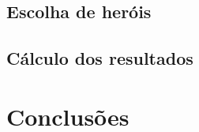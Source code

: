 \documentclass[a4paper]{article}
\begin{document}
\subsection{Escolha de heróis}

\hspace{3mm} 

\subsection{Cálculo dos resultados}

\hspace{3mm} 

\pagebreak


\section{Conclusões}
\label{sec:4}

\hspace{3mm} 
\end{document}
